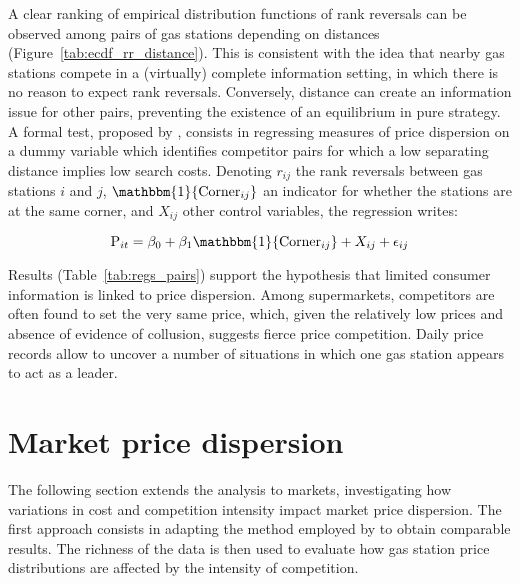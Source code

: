 \documentclass[english]{article}
\begin{document}
A clear ranking of empirical distribution functions of rank reversals can be observed among pairs of gas stations depending on distances (Figure~\ref{tab:ecdf_rr_distance}). This is consistent with the idea that nearby gas stations compete in a (virtually) complete information setting, in which there is no reason to expect rank reversals. Conversely, distance can create an information issue for other pairs, preventing the existence of an equilibrium in pure strategy. A formal test, proposed by \cite{TAP11}, consists in regressing measures of price dispersion on a dummy variable which identifies competitor pairs for which a low separating distance implies low search costs. Denoting $r_{ij}$ the rank reversals between gas stations $i$ and $j$, $\mathbbm{1}{\text{Corner}_{ij}}$ an indicator for whether the stations are at the same corner, and $X_{ij}$ other control variables, the regression writes:

\begin{equation}
\text{P}_{it}= \beta_0 + \beta_1 \mathbbm{1}{\text{Corner}_{ij}} + X_{ij} + \epsilon_{ij}
\end{equation}

Results (Table~\ref{tab:regs_pairs}) support the hypothesis that limited consumer information is linked to price dispersion. Among supermarkets, competitors are often found to set the very same price, which, given the relatively low prices and absence of evidence of collusion, suggests fierce price competition. Daily price records allow to uncover a number of situations in which one gas station appears to act as a leader.

\section{Market price dispersion}

The following section extends the analysis to markets, investigating how variations in cost and competition intensity impact market price dispersion. The first approach consists in adapting the method employed by \cite{TAP11} to obtain comparable results. The richness of the data is then used to evaluate how gas station price distributions are affected by the intensity of competition.
\end{document}
